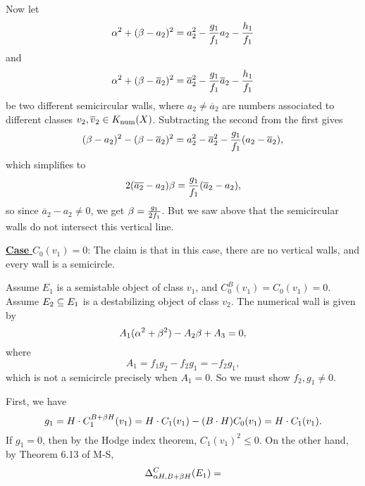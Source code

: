 \documentclass[letterpaper,10pt]{article}
\begin{document}
Now let 
\[ \alpha^2 + (\beta - a_2)^2 = a_2^2 - \frac{g_1}{f_1} a_2 - \frac{h_1}{f_1} \]
and
\[ \alpha^2 + (\beta - \overline{a}_2)^2 = \overline{a}_2^2 - \frac{g_1}{f_1} \overline{a}_2 - \frac{h_1}{f_1} \]
be two different semicircular walls, where $a_2 \neq \overline{a}_2$ are numbers associated to different classes $v_2, \overline{v}_2 \in K_{\mathrm{num}}(X)$. Subtracting the second from the first gives
\[ (\beta - a_2)^2 - (\beta - \overline{a}_2)^2 = a_2^2 - \overline{a}_2^2 - \frac{g_1}{f_1} (a_2 - \overline{a}_2), \]
which simplifies to
\[ 2(\overline{a_2} - a_2) \beta = \frac{g_1}{f_1}(\overline{a}_2 - a_2), \]
so since $\overline{a}_2 - a_2 \neq 0$, we get $\beta = \frac{g_1}{2 f_1}$. But we saw above that the semicircular walls do not intersect this vertical line.

\noindent\underline{{\bf Case} $C_0(v_1) = 0$}: The claim is that in this case, there are no vertical walls, and every wall is a semicircle. 

Assume $E_1$ is a semistable object of class $v_1$, and $C_0^B(v_1) = C_0(v_1) = 0$. Assume $E_2 \subseteq E_1$ is a destabilizing object of class $v_2$. The numerical wall is given by
\[ A_1 (\alpha^2 + \beta^2) - A_2 \beta + A_3 = 0, \]
where
\[ A_1 = f_1 g_2 - f_2 g_1 = - f_2 g_1, \]
which is not a semicircle precisely when $A_1 = 0$. So we must show $f_2, g_1 \neq 0$.

First, we have 
\[ g_1 = H\cdot C_1^{B + \beta H}(v_1) = H \cdot C_1(v_1) - (B\cdot H) C_0(v_1) = H \cdot C_1(v_1). \]
If $g_1 = 0$, then by the Hodge index theorem, $C_1(v_1)^2 \leq 0$. On the other hand, by Theorem 6.13 of M-S,
\[ \Delta^C_{\alpha H, B + \beta H}(E_1) =   \]
\end{document}

